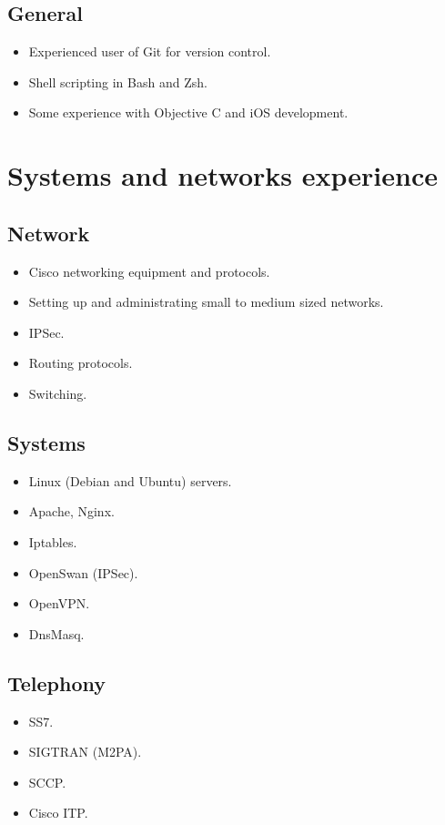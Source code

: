 \documentclass[a4paper, 11pt]{article}
\begin{document}
        \subsection*{General}
            \begin{itemize}
                \item Experienced user of Git for version control.
                \item Shell scripting in Bash and Zsh.
                \item Some experience with Objective C and iOS development.
            \end{itemize}


    \section*{Systems and networks experience}

        \subsection*{Network}
            \begin{itemize}
                \item Cisco networking equipment and protocols.
                \item Setting up and administrating small to medium sized networks.
                \item IPSec.
                \item Routing protocols.
                \item Switching.
            \end{itemize}

        \subsection*{Systems}
            \begin{itemize}
                \item Linux (Debian and Ubuntu) servers.
                \item Apache, Nginx.
                \item Iptables.
                \item OpenSwan (IPSec).
                \item OpenVPN.
                \item DnsMasq.
            \end{itemize}

        \subsection*{Telephony}
            \begin{itemize}
                \item SS7.
                \item SIGTRAN (M2PA).
                \item SCCP.
                \item Cisco ITP.
            \end{itemize}
\end{document}
